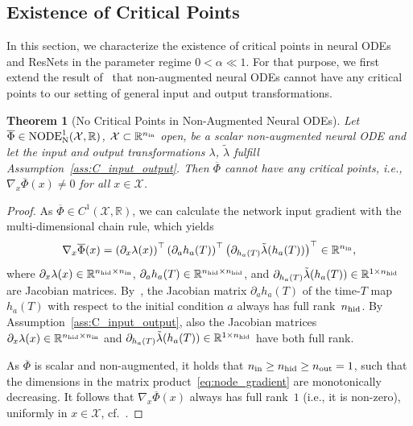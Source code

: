 \documentclass[10pt]{article}
\newtheorem{theorem}{Theorem}[section]
\theoremstyle{definition}
\numberwithin{equation}{section}
\newcommand{\R}{\mathbb{R}}
\newcommand*{\nout}{n_\textup{out}}
\newcommand*{\nhid}{n_\textup{hid}}
\newcommand*{\nin}{n_\textup{in}}
\begin{document}
\subsection{Existence of Critical Points}     
\label{sec:node_criticalpoints}

In this section, we characterize the existence of critical points in neural ODEs and ResNets in the parameter regime $0<\alpha \ll 1$. For that purpose, we first extend the result of~\cite{kk2025} that non-augmented neural ODEs cannot have any critical points to our setting of general input and output transformations.

\begin{theorem}[No Critical Points in Non-Augmented Neural ODEs]\label{th:node_criticalpoints}
	Let $\overline{\Phi} \in \textup{NODE}^1_{\textup{N}}(\mathcal{X},\R)$, $\mathcal{X}\subset \R^{\nin}$ open, be a scalar non-augmented neural ODE and let the input and output transformations $\lambda$, $\tilde{\lambda}$ fulfill Assumption~\ref{ass:C_input_output}. Then $\overline{\Phi}$ cannot have any critical points, i.e., $\nabla_x \overline{\Phi}(x) \neq 0$ for all $x \in \mathcal{X}$.
\end{theorem}

\begin{proof}
    As $\overline{\Phi} \in C^1(\mathcal{X},\R)$, we can calculate the network input gradient with the multi-dimensional chain rule, which yields
	\begin{equation} \label{eq:node_gradient}
		\nabla_x\overline{\Phi}(x) = \left(\partial_x \lambda(x)\right)^\top \left(\partial_a h_a(T) \right)^\top \left(\partial_{h_a(T)}{\tilde{\lambda}}(h_a(T))\right)^\top \in \R^{\nin},
	\end{equation}
	where $\partial_x \lambda(x) \in \R^{\nhid \times \nin}$, $\partial_a h_a(T)  \in \R^{\nhid \times \nhid}$, and $\partial_{h_a(T)}{\tilde{\lambda}}(h_a(T)) \in \R^{1 \times \nhid}$ are Jacobian matrices.
	By~\cite[Proposition 4.10]{kk2025}, the Jacobian matrix $\partial_a h_a(T)$ of the time-$T$ map $h_a(T)$ with respect to the initial condition $a$ always has full rank~$\nhid$. %
    By Assumption~\ref{ass:C_input_output}, also the Jacobian matrices $\partial_x \lambda(x) \in \R^{\nhid \times \nin}$ and $\partial_{h_a(T)}{\tilde{\lambda}}(h_a(T)) \in \R^{1 \times \nhid}$ have both full rank.
	
    As $\overline{\Phi}$ is scalar and non-augmented, it holds that $\nin \geq \nhid \geq \nout = 1$, such that the dimensions in the matrix product~\eqref{eq:node_gradient} are monotonically decreasing. It follows that $\nabla_x \overline{\Phi}(x)$ always has full rank~$1$ (i.e., it is non-zero), uniformly in $x \in \mathcal{X}$, cf.~\cite[Lemma C.1]{kk2025}.
\end{proof}
\end{document}
